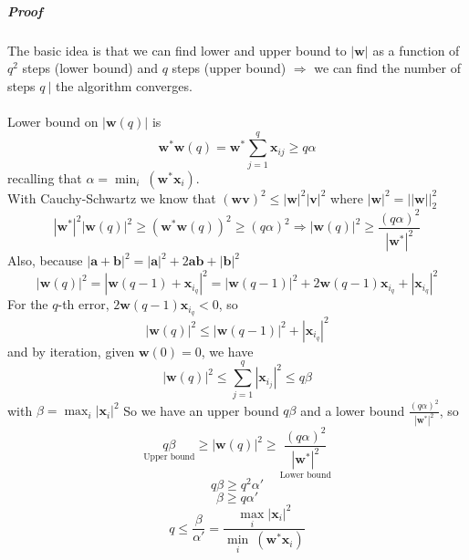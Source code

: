 \documentclass[10pt]{report}
\begin{document}
\subparagraph{Proof} The basic idea is that we can find lower and upper bound to $|\mathbf{w}|$ as a function of $q^2$ steps (lower bound) and $q$ steps (upper bound) $\Rightarrow$ we can find the number of steps $q\:|$ the algorithm converges.\\\\
Lower bound on $|\mathbf{w}(q)|$ is $$\mathbf{w}^* \mathbf{w}(q) = \mathbf{w}^*\sum_{j=1}^q \mathbf{x}_{ij}\geq q\alpha$$ recalling that $\alpha=\min_i\:(\mathbf{w}^*\mathbf{x}_i)$.\\
With Cauchy-Schwartz we know that $(\mathbf{wv})^2 \leq |\mathbf{w}|^2|\mathbf{v}|^2$ where $|\mathbf{w}|^2 = ||\mathbf{w}||_2 ^2$
$$|\mathbf{w}^*|^2|\mathbf{w}(q)|^2 \geq (\mathbf{w}^*\mathbf{w}(q))^2 \geq (q\alpha)^2 \Rightarrow |\mathbf{w}(q)|^2 \geq \frac{(q\alpha)^2}{|\mathbf{w}^*|^2}$$
Also, because $|\mathbf{a} + \mathbf{b}|^2 = |\mathbf{a}|^2 + 2\mathbf{ab} + |\mathbf{b}|^2$
$$|\mathbf{w}(q)|^2 = |\mathbf{w}(q-1)+ \mathbf{x}_{i_q}|^2 = |\mathbf{w}(q-1)|^2 + 2\mathbf{w}(q-1)\mathbf{x}_{i_q} + |\mathbf{x}_{i_q}|^2$$
For the $q$-th error, $2\mathbf{w}(q-1)\mathbf{x}_{i_q} < 0$, so $$|\mathbf{w}(q)|^2 \leq |\mathbf{w}(q-1)|^2 + |\mathbf{x}_{i_q}|^2$$ and by iteration, given $\mathbf{w}(0) = 0$, we have $$|\mathbf{w}(q)|^2 \leq \sum_{j=1}^q |\mathbf{x}_{i_j}|^2 \leq q\beta$$ with $\beta = \max_i |\mathbf{x}_i|^2$
So we have an upper bound $q\beta$ and a lower bound $\frac{(q\alpha)^2}{|\mathbf{w}^*|^2}$, so $$\underset{\text{Upper bound}}{q\beta}\geq |\mathbf{w}(q)|^2\geq \underset{\text{Lower bound}}{\frac{(q\alpha)^2}{|\mathbf{w}^*|^2}}$$ $$q\beta\geq q^2\alpha'$$ $$\beta\geq q\alpha'$$ $$q \leq \frac{\beta}{\alpha'} = \frac{\max_i |\mathbf{x}_i|^2}{\min_i\:(\mathbf{w}^*\mathbf{x}_i)}$$
\end{document}
